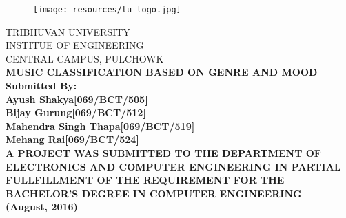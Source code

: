 \newpage
{}
\begin{figure}[t]
        \centering
        \texttt{[image: resources/tu-logo.jpg]}
\end{figure}
\begin{nscenter}
        TRIBHUVAN UNIVERSITY\\ 
        INSTITUE OF ENGINEERING\\
        CENTRAL CAMPUS, PULCHOWK\\
        \vspace{21mm}
        \bfseries{
                MUSIC CLASSIFICATION BASED ON GENRE AND MOOD\\
        }
        \vspace{14mm}
        \textbf {Submitted By:}\\
        \textnormal{
                Ayush Shakya\hspace{25mm}[069/BCT/505]\\
                Bijay Gurung\hspace{25mm}[069/BCT/512]\\
                Mahendra Singh Thapa\hspace{9mm}[069/BCT/519]\\
                Mehang Rai\hspace{28mm}[069/BCT/524]\\
        } 
        \vspace{18mm}
        \textnormal{
                A PROJECT WAS SUBMITTED TO THE DEPARTMENT OF ELECTRONICS
                AND COMPUTER ENGINEERING IN PARTIAL FULLFILLMENT OF THE REQUIREMENT
                FOR THE BACHELOR’S DEGREE IN COMPUTER ENGINEERING\\
                \vspace{17mm}
                (August, 2016)
        }
\end{nscenter}
